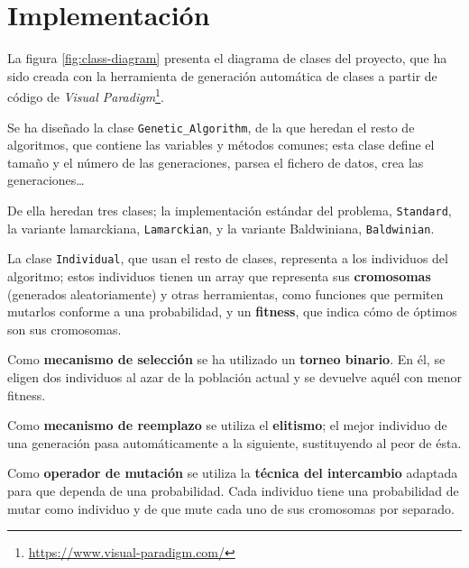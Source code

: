 \chapter{Implementación}
\label{chap:impl}

La figura \ref{fig:class-diagram} presenta el diagrama de clases del proyecto, que ha sido creada con la herramienta de generación automática de clases a partir de código de \textit{Visual Paradigm}\footnote{\url{https://www.visual-paradigm.com/}}.

Se ha diseñado la clase \texttt{Genetic\_Algorithm}, de la que heredan el resto de algoritmos, que contiene las variables y métodos comunes; esta clase define el tamaño y el número de las generaciones, parsea el fichero de datos, crea las generaciones\dots

De ella heredan tres clases; la implementación estándar del problema, \texttt{Standard}, la variante lamarckiana, \texttt{Lamarckian}, y la variante Baldwiniana, \texttt{Baldwinian}.

La clase \texttt{Individual}, que usan el resto de clases, representa a los individuos del algoritmo; estos individuos tienen un array que representa sus \textbf{cromosomas} (generados aleatoriamente) y otras herramientas, como funciones que permiten mutarlos conforme a una probabilidad, y un \textbf{fitness}, que indica cómo de óptimos son sus cromosomas.

Como \textbf{mecanismo de selección} se ha utilizado un \textbf{torneo binario}. En él, se eligen dos individuos al azar de la población actual y se devuelve aquél con menor fitness.

Como \textbf{mecanismo de reemplazo} se utiliza el \textbf{elitismo}; el mejor individuo de una generación pasa automáticamente a la siguiente, sustituyendo al peor de ésta.

Como \textbf{operador de mutación} se utiliza la \textbf{técnica del intercambio} adaptada para que dependa de una probabilidad. Cada individuo tiene una probabilidad de mutar como individuo y de que mute cada uno de sus cromosomas por separado.

\newpage

\vspace*{4em}

